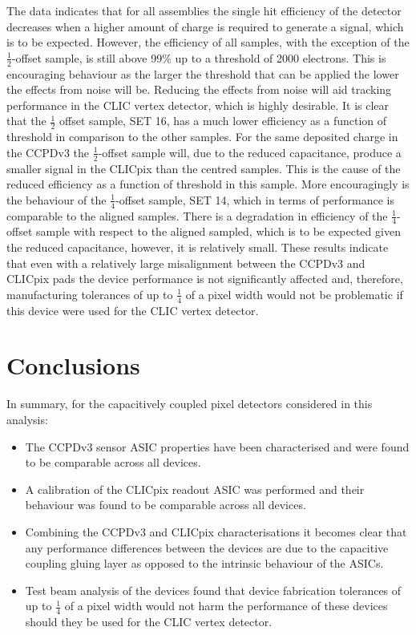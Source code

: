 The data indicates that for all assemblies the single hit efficiency of the detector decreases when a higher amount of charge is required to generate a signal, which is to be expected.  However, the efficiency of all samples, with the exception of the $\frac{1}{2}$-offset sample, is still above 99\% up to a threshold of 2000 electrons.  This is encouraging behaviour as the larger the threshold that can be applied the lower the effects from noise will be.  Reducing the effects from noise will aid tracking performance in the CLIC vertex detector, which is highly desirable.  It is clear that the $\frac{1}{2}$ offset sample, SET 16, has a much lower efficiency as a function of threshold in comparison to the other samples.  For the same deposited charge in the CCPDv3 the $\frac{1}{2}$-offset sample will, due to the reduced capacitance, produce a smaller signal in the CLICpix than the centred samples.  This is the cause of the reduced efficiency as a function of threshold in this sample.  More encouragingly is the behaviour of the $\frac{1}{4}$-offset sample, SET 14, which in terms of performance is comparable to the aligned samples.  There is a degradation in efficiency of the $\frac{1}{4}$-offset sample with respect to the aligned sampled, which is to be expected given the reduced capacitance, however, it is relatively small.  These results indicate that even with a relatively large misalignment between the CCPDv3 and CLICpix pads the device performance is not significantly affected and, therefore, manufacturing tolerances of up to $\frac{1}{4}$ of a pixel width would not be problematic if this device were used for the CLIC vertex detector.


\section{Conclusions}
In summary, for the capacitively coupled pixel detectors considered in this analysis:

\begin{itemize}
\item The CCPDv3 sensor ASIC properties have been characterised and were found to be comparable across all devices.
\item A calibration of the CLICpix readout ASIC was performed and their behaviour was found to be comparable across all devices.  
\item Combining the CCPDv3 and CLICpix characterisations it becomes clear that any performance differences between the devices are due to the capacitive coupling gluing layer as opposed to the intrinsic behaviour of the ASICs.
\item Test beam analysis of the devices found that device fabrication tolerances of up to $\frac{1}{4}$ of a pixel width would not harm the performance of these devices should they be used for the CLIC vertex detector.  
\end{itemize}


  
